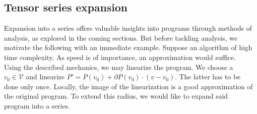 \documentclass[preprint,12pt]{elsarticle}
\newcommand{\VV}{\mathcal{V}}
\newcommand{\D}{\partial}
\begin{document}
 \subsection{Tensor series expansion}\label{sec:Vrsta}
 
 Expansion into a series offers valuable insights into programs through methods of analysis, as explored in the coming sections. But before tackling analysis, we motivate the following with an immediate example. Suppose an algorithm of high time complexity. As speed is of importance, an approximation would suffice. Using the described mechanics, we may linearize the program. We choose a $v_0\in\VV$ and linearize $P'=P(v_0)+\D P(v_0)\cdot(v-v_0)$. The latter has to be done only once.
 Locally, the image of the linearization is a good approximation of the original program. To extend this radius, we would like to expand said program into a series.
 
\end{document}
